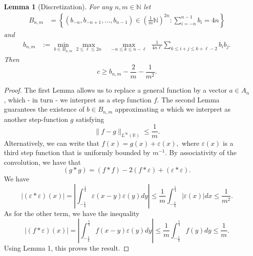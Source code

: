 \documentclass[10pt]{amsart}
\newtheorem{lemma}{Lemma}
\begin{document}
\begin{lemma}[Discretization] \label{disc}  For any $n, m \in \mathbb{N}$ let
\begin{align*}
B_{n,m} &= \left\{(b_{-n}, b_{-n+1}, \dots, b_{n-1}) \in \left(\frac{1}{m}\mathbb{N}\right)^{2n}: \sum_{i=-n}^{n-1}{b_i} = 4n\right\} 
\end{align*}
and
\begin{align*}
b_{n,m} &:= \min_{b \in B_{n,m}} \max_{2 \leq \ell \leq 2n} ~~~~\max_{-n \leq k \leq n-\ell}~~
\frac{1}{4n\ell}\sum_{k \leq i+j \leq k +\ell - 2}{b_i b_j}.
\end{align*}
 Then
$$  c \geq b_{n,m} - \frac{2}{m} - \frac{1}{m^2}.$$
\end{lemma}
\begin{proof} The first Lemma allows us to replace a general function by a vector $a \in A_{n}$, which - in turn - we interpret as a step function $f$. The second Lemma guarantees
the existence of $b \in B_{n,m}$ approximating $a$ which we interpret as another step-function $g$
satisfying
$$ \|f-g\|_{L^{\infty}(\mathbb{R})} \leq \frac{1}{m}.$$
Alternatively, we can write that $f(x) = g(x) + \varepsilon(x),$ where $\varepsilon(x)$ is a third step function that is uniformly bounded by $m^{-1}$. 
By associativity of the convolution, we have that
$$ (g*g) = (f*f) - 2(f*\varepsilon) + (\varepsilon*\varepsilon).$$
We have 
$$ | (\varepsilon*\varepsilon)(x)|= \left|\int_{-\frac{1}{4}}^{\frac{1}{4}}{\varepsilon(x-y)\varepsilon(y) dy} \right| \leq \frac{1}{m}\int_{-\frac{1}{4}}^{\frac{1}{4}}{ |\varepsilon(x)| dx} \leq  \frac{1}{m^2}.$$
As for the other term, we have the inequality
$$ |(f*\varepsilon)(x)| = \left|\int_{-\frac{1}{4}}^{\frac{1}{4}}{f(x-y)\varepsilon(y) dy} \right| \leq  \frac{1}{m}\int_{-\frac{1}{4}}^{\frac{1}{4}}{f(y) dy} \leq \frac{1}{m}.$$
Using Lemma 1, this proves the result.
\end{proof}
\end{document}
